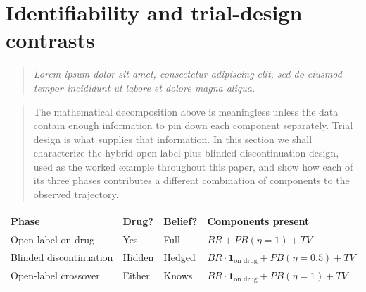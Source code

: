 \documentclass[
  11pt,
]{article}
\newcounter{none} %
\newenvironment{rgt}{%
  \begin{quote}\small\itshape\color[RGB]{20,60,160}}{%
  \end{quote}}
\newenvironment{orig}{%
  \begin{quote}\normalsize\color[gray]{0.55}}{%
  \end{quote}}
\begin{document}
\section{Identifiability and trial-design contrasts}\label{identifiability-and-trial-design-contrasts}

\begin{rgt}
Lorem ipsum dolor sit amet, consectetur adipiscing elit, sed do eiusmod tempor incididunt ut labore et dolore magna aliqua.

\end{rgt}

\begin{orig}
The mathematical decomposition above is meaningless unless the
data contain enough information to pin down each component
separately. Trial design is what supplies that information. In
this section we shall characterize the hybrid
open-label-plus-blinded-discontinuation design, used as the
worked example throughout this paper, and show how each of its
three phases contributes a different combination of components
to the observed trajectory.

\end{orig}

{\def\LTcaptype{none} %
\begin{longtable}[]{@{}
  >{\raggedright\arraybackslash}p{}
  >{\raggedright\arraybackslash}p{}
  >{\raggedright\arraybackslash}p{}
  >{\raggedright\arraybackslash}p{}@{}}
\toprule\noalign{}
\begin{minipage}[b]{\linewidth}\raggedright
Phase
\end{minipage} & \begin{minipage}[b]{\linewidth}\raggedright
Drug?
\end{minipage} & \begin{minipage}[b]{\linewidth}\raggedright
Belief?
\end{minipage} & \begin{minipage}[b]{\linewidth}\raggedright
Components present
\end{minipage} \\
\midrule\noalign{}
\endhead
\bottomrule\noalign{}
\endlastfoot
Open-label on drug & Yes & Full & \(BR + PB(\eta = 1) + TV\) \\
Blinded discontinuation & Hidden & Hedged & \(BR \cdot \mathbf{1}_{\text{on drug}} + PB(\eta = 0.5) + TV\) \\
Open-label crossover & Either & Knows & \(BR \cdot \mathbf{1}_{\text{on drug}} + PB(\eta = 1) + TV\) \\
\end{longtable}
}
\end{document}
